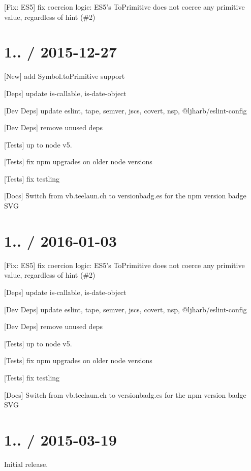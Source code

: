 
\begin{DoxyItemize}
\item \mbox{[}Fix\+: E\+S5\mbox{]} fix coercion logic\+: E\+S5’s To\+Primitive does not coerce any primitive value, regardless of hint (\#2)
\end{DoxyItemize}

\section*{1.. / 2015-\/12-\/27 }


\begin{DoxyItemize}
\item \mbox{[}New\mbox{]} add {\ttfamily Symbol.\+to\+Primitive} support
\item \mbox{[}Deps\mbox{]} update {\ttfamily is-\/callable}, {\ttfamily is-\/date-\/object}
\item \mbox{[}Dev Deps\mbox{]} update {\ttfamily eslint}, {\ttfamily tape}, {\ttfamily semver}, {\ttfamily jscs}, {\ttfamily covert}, {\ttfamily nsp}, {\ttfamily @ljharb/eslint-\/config}
\item \mbox{[}Dev Deps\mbox{]} remove unused deps
\item \mbox{[}Tests\mbox{]} up to {\ttfamily node} {\ttfamily v5.}
\item \mbox{[}Tests\mbox{]} fix npm upgrades on older node versions
\item \mbox{[}Tests\mbox{]} fix testling
\item \mbox{[}Docs\mbox{]} Switch from vb.\+teelaun.\+ch to versionbadg.\+es for the npm version badge S\+VG
\end{DoxyItemize}

\section*{1.. / 2016-\/01-\/03 }


\begin{DoxyItemize}
\item \mbox{[}Fix\+: E\+S5\mbox{]} fix coercion logic\+: E\+S5’s To\+Primitive does not coerce any primitive value, regardless of hint (\#2)
\item \mbox{[}Deps\mbox{]} update {\ttfamily is-\/callable}, {\ttfamily is-\/date-\/object}
\item \mbox{[}Dev Deps\mbox{]} update {\ttfamily eslint}, {\ttfamily tape}, {\ttfamily semver}, {\ttfamily jscs}, {\ttfamily covert}, {\ttfamily nsp}, {\ttfamily @ljharb/eslint-\/config}
\item \mbox{[}Dev Deps\mbox{]} remove unused deps
\item \mbox{[}Tests\mbox{]} up to {\ttfamily node} {\ttfamily v5.}
\item \mbox{[}Tests\mbox{]} fix npm upgrades on older node versions
\item \mbox{[}Tests\mbox{]} fix testling
\item \mbox{[}Docs\mbox{]} Switch from vb.\+teelaun.\+ch to versionbadg.\+es for the npm version badge S\+VG
\end{DoxyItemize}

\section*{1.. / 2015-\/03-\/19 }


\begin{DoxyItemize}
\item Initial release. 
\end{DoxyItemize}